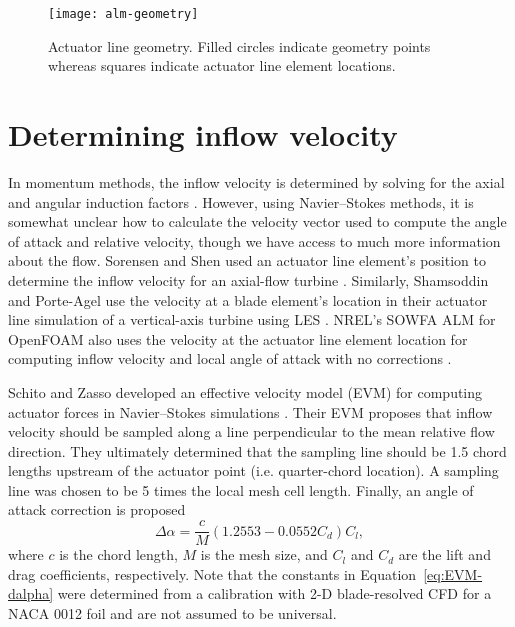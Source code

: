 \begin{figure}
    \centering

    \texttt{[image: alm-geometry]}

    \caption{Actuator line geometry. Filled circles indicate geometry points
        whereas squares indicate actuator line element locations.}

    \label{fig:AL-geom}
\end{figure}


\section{Determining inflow velocity}

In momentum methods, the inflow velocity is determined by solving for the axial
and angular induction factors \cite{Manwell2002}. However, using Navier--Stokes
methods, it is somewhat unclear how to calculate the velocity vector used to
compute the angle of attack and relative velocity, though we have access to much
more information about the flow. Sorensen and Shen used an actuator line
element's position to determine the inflow velocity for an axial-flow turbine
\cite{Sorensen2002}. Similarly, Shamsoddin and Porte-Agel use the velocity at a
blade element's location in their actuator line simulation of a vertical-axis
turbine using LES \cite{Shamsoddin2014}. NREL's SOWFA ALM for OpenFOAM also uses
the velocity at the actuator line element location for computing inflow velocity
and local angle of attack with no corrections \cite{Churchfield2013}.

Schito and Zasso developed an effective velocity model (EVM) for computing
actuator forces in Navier--Stokes simulations \cite{Schito2014}. Their EVM
proposes that inflow velocity should be sampled along a line perpendicular to
the mean relative flow direction. They ultimately determined that the sampling
line should be 1.5 chord lengths upstream of the actuator point (i.e.
quarter-chord location). A sampling line was chosen to be 5 times the local mesh
cell length. Finally, an angle of attack correction is proposed
\begin{equation}
    \Delta \alpha = \frac{c}{M} (1.2553 - 0.0552 C_d) C_l,
    \label{eq:EVM-dalpha}
\end{equation}
where $c$ is the chord length, $M$ is the mesh size, and $C_l$ and $C_d$ are the
lift and drag coefficients, respectively. Note that the constants in
Equation~\ref{eq:EVM-dalpha} were determined from a calibration with 2-D
blade-resolved CFD for a NACA 0012 foil and are not assumed to be universal.

